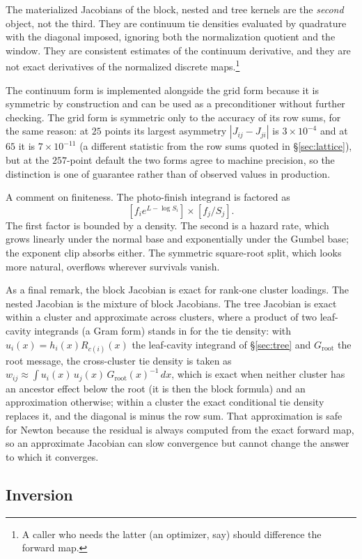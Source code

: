 \documentclass[11pt]{article}
\begin{document}
The materialized Jacobians of the block, nested and tree kernels are
the \emph{second} object, not the third. They are continuum tie densities
evaluated by quadrature with the diagonal imposed, ignoring both the
normalization quotient and the window. They are consistent estimates of
the continuum derivative, and they are not exact derivatives of the
normalized discrete maps.\footnote{A caller who needs the
latter (an optimizer, say) should difference the forward map.}

The continuum form is implemented alongside the grid form because it is
symmetric by construction and can be used as a preconditioner without
further checking. The grid form is symmetric only to the accuracy of its
row sums, for the same reason: at $25$ points its largest asymmetry
$|J_{ij}-J_{ji}|$ is
$3\times10^{-4}$ and at $65$ it is $7\times10^{-11}$ (a different
statistic from the row sums quoted in \S\ref{sec:lattice}), but at the $257$-point
default the two forms agree to machine precision, so the distinction is
one of guarantee rather than of observed values in production.

A comment on finiteness. The photo-finish integrand is
factored as $$[f_i e^{L-\log S_i}]\times[f_j/S_j].$$ The first factor is
bounded by a density. The second is a hazard rate, which grows linearly
under the normal base and exponentially under the Gumbel base; the
exponent clip absorbs either. The symmetric square-root split, which
looks more natural, overflows wherever survivals vanish.

As a final remark, the block Jacobian is exact for
rank-one cluster loadings. The nested Jacobian is the
mixture of block Jacobians. The tree Jacobian is exact within a cluster
and approximate across clusters, where a product of two leaf-cavity
integrands (a Gram form) stands in for the tie density: with $u_i(x)=h_i(x)R_{c(i)}(x)$ the
leaf-cavity integrand of \S\ref{sec:tree} and $G_{\mathrm{root}}$ the
root message, the cross-cluster tie density is taken as
$w_{ij}\approx\int u_i(x)\,u_j(x)\,G_{\mathrm{root}}(x)^{-1}\,dx$, which is
exact when neither cluster has an ancestor effect below the root (it
is then the block formula) and an approximation otherwise; within a
cluster the exact conditional tie density replaces it, and the diagonal
is minus the row sum. That approximation is safe for
Newton because the residual is always computed from the exact forward
map, so an approximate Jacobian can slow convergence but cannot change the
answer to which it converges.

\subsection{Inversion}
\end{document}

